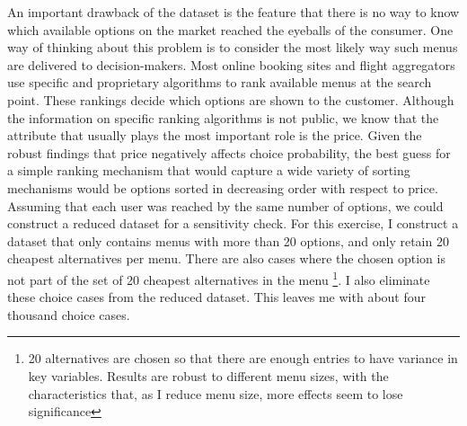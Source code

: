\documentclass[a4paper,12pt]{article}
\begin{document}
An important drawback of the dataset is the feature that there is no way to know which available options on the market reached the eyeballs of the consumer. One way of thinking about this problem is to consider the most likely way such menus are delivered to decision-makers. Most online booking sites and flight aggregators use specific and proprietary algorithms to rank available menus at the search point. These rankings decide which options are shown to the customer. Although the information on specific ranking algorithms is not public, we know that the attribute that usually plays the most important role is the price. Given the robust findings that price negatively affects choice probability, the best guess for a simple ranking mechanism that would capture a wide variety of sorting mechanisms would be options sorted in decreasing order with respect to price. Assuming that each user was reached by the same number of options, we could construct a reduced dataset for a sensitivity check. For this exercise, I construct a dataset that only contains menus with more than 20 options, and only retain 20 cheapest alternatives per menu. There are also cases where the chosen option is not part of the set of 20 cheapest alternatives in the menu \footnote{20 alternatives are chosen so that there are enough entries to have variance in key variables. Results are robust to different menu sizes, with the characteristics that, as I reduce menu size, more effects seem to lose significance}. I also eliminate these choice cases from the reduced dataset. This leaves me with about four thousand choice cases.

\clearpage
\end{document}
